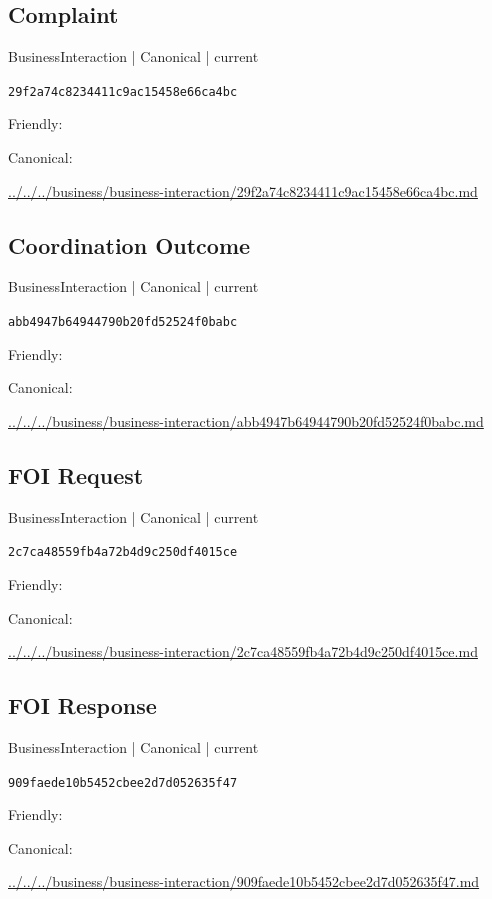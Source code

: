 \documentclass[10pt,a4paper]{article}
\begin{document}
\subsection*{Complaint}
{\small BusinessInteraction | Canonical | current}\par
\texttt{29f2a74c8234411c9ac15458e66ca4bc}\par
Friendly: \par
Canonical: \par
{\footnotesize\url{../../../business/business-interaction/29f2a74c8234411c9ac15458e66ca4bc.md}}\par
\subsection*{Coordination Outcome}
{\small BusinessInteraction | Canonical | current}\par
\texttt{abb4947b64944790b20fd52524f0babc}\par
Friendly: \par
Canonical: \par
{\footnotesize\url{../../../business/business-interaction/abb4947b64944790b20fd52524f0babc.md}}\par
\subsection*{FOI Request}
{\small BusinessInteraction | Canonical | current}\par
\texttt{2c7ca48559fb4a72b4d9c250df4015ce}\par
Friendly: \par
Canonical: \par
{\footnotesize\url{../../../business/business-interaction/2c7ca48559fb4a72b4d9c250df4015ce.md}}\par
\subsection*{FOI Response}
{\small BusinessInteraction | Canonical | current}\par
\texttt{909faede10b5452cbee2d7d052635f47}\par
Friendly: \par
Canonical: \par
{\footnotesize\url{../../../business/business-interaction/909faede10b5452cbee2d7d052635f47.md}}\par
\end{document}
